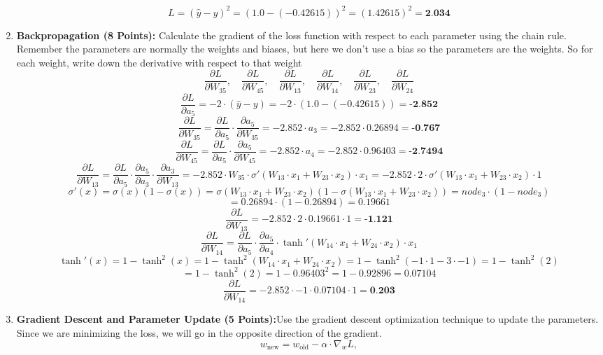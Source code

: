 \documentclass{article}
\begin{document}
\begin{enumerate}
    \[
    L = (\hat{y} - y)^2 = (1.0 - (-0.42615))^2 = (1.42615)^2 = \textbf{2.034}
    \]
    \item \textbf{Backpropagation (8 Points):} Calculate the gradient of the loss function with respect to each parameter
using the chain rule. Remember the parameters are normally the weights and biases, but here we
don’t use a bias so the parameters are the weights. So for each weight, write down the derivative with
respect to that weight
    \[ 
        \frac{\partial L}{\partial W_{35}}, \quad \frac{\partial L}{\partial W_{45}}, \quad \frac{\partial L}{\partial W_{13}}, \quad \frac{\partial L}{\partial W_{14}}, \quad \frac{\partial L}{\partial W_{23}}, \quad \frac{\partial L}{\partial W_{24}} 
    \]
    \[
    \frac{\partial L}{\partial a_5} = -2 \cdot (\hat{y} - y) = -2 \cdot (1.0 - (-0.42615)) = \textbf{-2.852}
    \]
    \[
    \frac{\partial L}{\partial W_{35}} = \frac{\partial L}{\partial a_5} \cdot \frac{\partial a_5}{\partial W_{35}} = -2.852 \cdot a_3 = -2.852 \cdot 0.26894 = \textbf{-0.767}
    \]
    \[
    \frac{\partial L}{\partial W_{45}} = \frac{\partial L}{\partial a_5} \cdot \frac{\partial a_5}{\partial W_{45}} = -2.852 \cdot a_4 = -2.852 \cdot 0.96403 = \textbf{-2.7494}
    \]
    \[
    \frac{\partial L}{\partial W_{13}} = \frac{\partial L}{\partial a_5} \cdot \frac{\partial a_5}{\partial a_3} \cdot \frac{\partial a_3}{\partial W_{13}} = -2.852 \cdot W_{35} \cdot \sigma'(W_{13} \cdot x_1 + W_{23} \cdot x_2)  \cdot x_1 = -2.852 \cdot 2 \cdot \sigma'(W_{13} \cdot x_1 + W_{23} \cdot x_2)  \cdot 1 
    \]
    \[
    \sigma'(x) = \sigma(x)(1 - \sigma(x)) = \sigma(W_{13} \cdot x_1 + W_{23} \cdot x_2)(1 - \sigma(W_{13} \cdot x_1 + W_{23} \cdot x_2)) = node_3 \cdot (1 - node_3) 
    \]
    \[
        = 0.26894 \cdot (1 - 0.26894) = 0.19661
    \]
    \[
    \frac{\partial L}{\partial W_{13}} = -2.852 \cdot 2 \cdot 0.19661 \cdot 1 = \textbf{-1.121}
    \]
    \[
    \frac{\partial L}{\partial W_{14}} = \frac{\partial L}{\partial a_5} \cdot \frac{\partial a_5}{\partial a_4} \cdot \tanh'(W_{14} \cdot x_1 + W_{24} \cdot x_2)  \cdot x_1 
    \]
    \[
        \tanh'(x) = 1 - \tanh^2(x) = 1 - \tanh^2(W_{14} \cdot x_1 + W_{24} \cdot x_2) = 1 - \tanh^2(-1 \cdot 1 - 3 \cdot -1) = 1 - \tanh^2(2) 
    \]
    \[
        = 1 - \tanh^2(2) = 1 - 0.96403^2 = 1 - 0.92896 = 0.07104
    \]
    \[
    \frac{\partial L}{\partial W_{14}} = -2.852 \cdot -1 \cdot 0.07104 \cdot 1 = \textbf{0.203}
    \]
\item \textbf{Gradient Descent and Parameter Update (5 Points):}Use the gradient descent optimization
technique to update the parameters. Since we are minimizing the loss, we will go in the opposite
direction of the gradient.
    \[
    w_{\text{new}} = w_{\text{old}} - \alpha \cdot \nabla_w L,
    \]
    

\end{enumerate}
\end{document}
